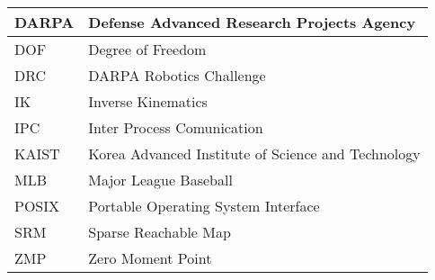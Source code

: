 \begin{tabular}{l | l}
\hline
DARPA  &  Defense Advanced Research Projects Agency\\
\hline 
DOF & Degree of Freedom \\
\hline
DRC  & DARPA Robotics Challenge \\
\hline
IK & Inverse Kinematics\\ 
\hline
IPC & Inter Process Comunication \\
\hline
KAIST & Korea Advanced Institute of Science and Technology \\
\hline
MLB & Major League Baseball\\
\hline
POSIX & Portable Operating System Interface\\
\hline
SRM & Sparse Reachable Map \\
\hline 
ZMP & Zero Moment Point\\
\hline
\end{tabular}
